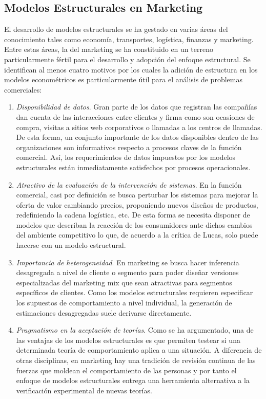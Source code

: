 \documentclass[
]{book}
\begin{document}
\hypertarget{modelos-estructurales-en-marketing}{%
\subsection{Modelos Estructurales en Marketing}\label{modelos-estructurales-en-marketing}}

El desarrollo de modelos estructurales se ha gestado en varias áreas del conocimiento tales como economía, transportes, logística, finanzas y marketing. Entre estas áreas, la del marketing se ha constituido en un terreno particularmente fértil para el desarrollo y adopción del enfoque estructural. Se identifican al menos cuatro motivos por los cuales la adición de estructura en los modelos econométricos es particularmente útil para el análisis de problemas comerciales:

\begin{enumerate}
\def\labelenumi{\arabic{enumi}.}
\item
  \emph{Disponibilidad de datos}. Gran parte de los datos que registran las compañías dan cuenta de las interacciones entre clientes y firma como son ocasiones de compra, visitas a sitios web corporativos o llamadas a los centros de llamadas. De esta forma, un conjunto importante de los datos disponibles dentro de las organizaciones son informativos respecto a procesos claves de la función comercial. Así, los requerimientos de datos impuestos por los modelos estructurales están inmediatamente satisfechos por procesos operacionales.
\item
  \emph{Atractivo de la evaluación de la intervención de sistemas}. En la función comercial, casi por definición se busca perturbar los sistemas para mejorar la oferta de valor cambiando precios, proponiendo nuevos diseños de productos, redefiniendo la cadena logística, etc. De esta forma se necesita disponer de modelos que describan la reacción de los consumidores ante dichos cambios del ambiente competitivo lo que, de acuerdo a la crítica de Lucas, solo puede hacerse con un modelo estructural.
\item
  \emph{Importancia de heterogeneidad}. En marketing se busca hacer inferencia desagregada a nivel de cliente o segmento para poder diseñar versiones especializadas del marketing mix que sean atractivas para segmentos específicos de clientes. Como los modelos estructurales requieren especificar los supuestos de comportamiento a nivel individual, la generación de estimaciones desagregadas suele derivarse directamente.
\item
  \emph{Pragmatismo en la aceptación de teorías}. Como se ha argumentado, una de las ventajas de los modelos estructurales es que permiten testear si una determinada teoría de comportamiento aplica a una situación. A diferencia de otras disciplinas, en marketing hay una tradición de revisión continua de las fuerzas que moldean el comportamiento de las personas y por tanto el enfoque de modelos estructurales entrega una herramienta alternativa a la verificación experimental de nuevas teorías.
\end{enumerate}
\end{document}
